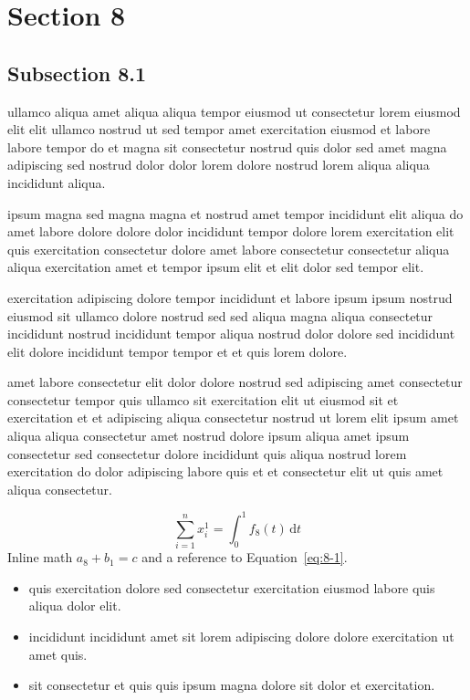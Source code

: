 \documentclass{article}
\begin{document}
\section{Section 8}\label{sec:8}
\subsection{Subsection 8.1}\label{sec:8-1}
ullamco aliqua amet aliqua aliqua tempor eiusmod ut consectetur lorem eiusmod elit elit ullamco nostrud ut sed tempor amet exercitation eiusmod et labore labore tempor do et magna sit consectetur nostrud quis dolor sed amet magna adipiscing sed nostrud dolor dolor lorem dolore nostrud lorem aliqua aliqua incididunt aliqua.

ipsum magna sed magna magna et nostrud amet tempor incididunt elit aliqua do amet labore dolore dolore dolor incididunt tempor dolore lorem exercitation elit quis exercitation consectetur dolore amet labore consectetur consectetur aliqua aliqua exercitation amet et tempor ipsum elit et elit dolor sed tempor elit.

exercitation adipiscing dolore tempor incididunt et labore ipsum ipsum nostrud eiusmod sit ullamco dolore nostrud sed sed aliqua magna aliqua consectetur incididunt nostrud incididunt tempor aliqua nostrud dolor dolore sed incididunt elit dolore incididunt tempor tempor et et quis lorem dolore.

amet labore consectetur elit dolor dolore nostrud sed adipiscing amet consectetur consectetur tempor quis ullamco sit exercitation elit ut eiusmod sit et exercitation et et adipiscing aliqua consectetur nostrud ut lorem elit ipsum amet aliqua aliqua consectetur amet nostrud dolore ipsum aliqua amet ipsum consectetur sed consectetur dolore incididunt quis aliqua nostrud lorem exercitation do dolor adipiscing labore quis et et consectetur elit ut quis amet aliqua consectetur.

\begin{equation}\label{eq:8-1}
  \sum_{i=1}^{n} x_i^{1} = \int_0^1 f_{8}(t)\,\mathrm{d}t
\end{equation}
Inline math $a_{8} + b_{1} = c$ and a reference to Equation~\eqref{eq:8-1}.

\begin{itemize}
  \item quis exercitation dolore sed consectetur exercitation eiusmod labore quis aliqua dolor elit.
  \item incididunt incididunt amet sit lorem adipiscing dolore dolore exercitation ut amet quis.
  \item sit consectetur et quis quis ipsum magna dolore sit dolor et exercitation.
\end{itemize}
\end{document}
